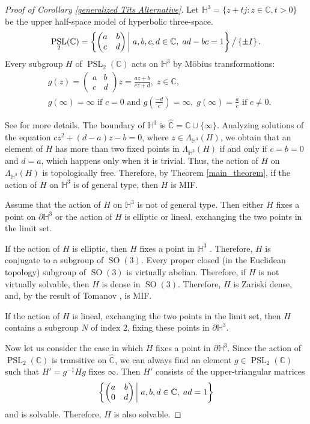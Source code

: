 \documentclass[11pt,letterpaper]{article}
\newcommand{\HH}{\mathbb{H}}
\newcommand{\CC}{\mathbb{C}}
\DeclareMathOperator{\PSL}{PSL}
\DeclareMathOperator{\SO}{SO}
\theoremstyle{definition}
\theoremstyle{remark}
\begin{document}
\begin{proof}[Proof of Corollary \ref{generalized Tits Alternative}]
Let $\HH^3=\{z+t j: z \in \CC, t>0\}$ be the upper half-space model of hyperbolic three-space.
$$\PSL_2(\CC)=\left\{\begin{pmatrix} a & b\\ c & d \end{pmatrix} \;   \vrule \; a, b, c, d \in \CC, \;  ad-bc=1  \right\} \big / \left\{ \pm I \right \}.$$ 
Every subgroup $H$ of $\PSL_2(\CC)$ acts on $\mathbb H^3$ by M\"obius transformations:
$$
\begin{aligned}
&g(z)=\begin{pmatrix} a & b\\ c & d \end{pmatrix}z = \frac{az+b}{cz+d}, \; z \in \CC, \\
& g(\infty)=\infty \text{ if } c=0 \text{ and } g\left(\frac{-d}{c}\right)=\infty, \; g(\infty)=\frac{a}{c} \text{ if } c \neq 0.
\end{aligned}
$$

See \cite[Chapter 4]{Bea} for more details. 
The boundary of $\HH^3$ is $\widehat{\CC}=\CC \cup\{\infty\}$. Analyzing solutions of the equation 
$cz^2+(d-a)z-b=0$, where $z \in \Lambda_{\HH^3}(H)$, we obtain that an element of $H$ has more than two fixed points in $\Lambda_{\HH^3}(H)$ if and only if $c=b=0$ and $d=a$, which happens only when it is trivial. Thus, the action of $H$ on $\Lambda_{\HH^3}(H)$ is topologically free. Therefore, by Theorem \ref{main_theorem}, if the action of $H$ on $\HH^3$ is of general type, then $H$ is MIF.

Assume that the action of $H$ on $\HH^3$ is not of general type. Then either $H$ fixes a point on $\partial \HH^3$ or the action of $H$ is elliptic or lineal, exchanging the two points in the limit set. 

If the action of $H$ is elliptic, then $H$ fixes a point in $\HH^3$ \cite[Thm 4.3.7]{Bea}. Therefore, $H$ is conjugate to a subgroup of $\SO(3)$. Every proper closed (in the Euclidean topology) subgroup of $\SO(3)$ is virtually abelian. Therefore, if $H$ is not virtually solvable, then $H$ is dense in $\SO(3)$. Therefore, $H$ is Zariski dense, and, by the result of Tomanov \cite{Tom}, is MIF.

If the action of $H$ is lineal, exchanging the two points in the limit set, then $H$ contains a subgroup $N$ of index $2$, fixing these points in $\partial \HH^3$.

Now let us consider the case in which $H$ fixes a point in $\partial \HH^3$. Since the action of $\PSL_2(\CC)$ is transitive on  $\widehat{\CC}$, we can always find an element $g \in \PSL_2(\CC)$ such that $H' = g^{-1}Hg$ fixes $\infty$. 
Then $H'$ consists of the upper-triangular matrices 
$$\left\{\begin{pmatrix} a & b\\ 0 & d \end{pmatrix} \;   \vrule \; a, b, d \in \CC, \;  ad=1  \right\}$$
and is solvable. Therefore, $H$ is also solvable.
\end{proof} 
\end{document}
